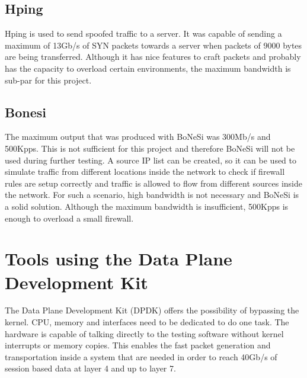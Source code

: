 \subsection{Hping}
Hping is used to send spoofed traffic to a server. It was capable of sending a maximum of 13Gb/s of SYN packets towards a server when packets of 9000 bytes are being transferred. Although it has nice features to craft packets and probably has the capacity to overload certain environments, the maximum bandwidth is sub-par for this project.  

\subsection{Bonesi}
The maximum output that was produced with BoNeSi was 300Mb/s and 500Kpps. This is not sufficient for this project and therefore BoNeSi will not be used during further testing. A source IP list can be created, so it can be used to simulate traffic from different locations inside the network to check if firewall rules are setup correctly and traffic is allowed to flow from different sources inside the network. For such a scenario, high bandwidth is not necessary and BoNeSi is a solid solution. Although the maximum bandwidth is insufficient, 500Kpps is enough to overload a small firewall.  

\section{Tools using the Data Plane Development Kit}
The Data Plane Development Kit (DPDK) offers the possibility of bypassing the kernel. CPU, memory and interfaces need to be dedicated to do one task. The hardware is capable of talking directly to the testing software without kernel interrupts or memory copies. This enables the fast packet generation and transportation inside a system that are needed in order to reach 40Gb/s of session based data at layer 4 and up to layer 7. 

